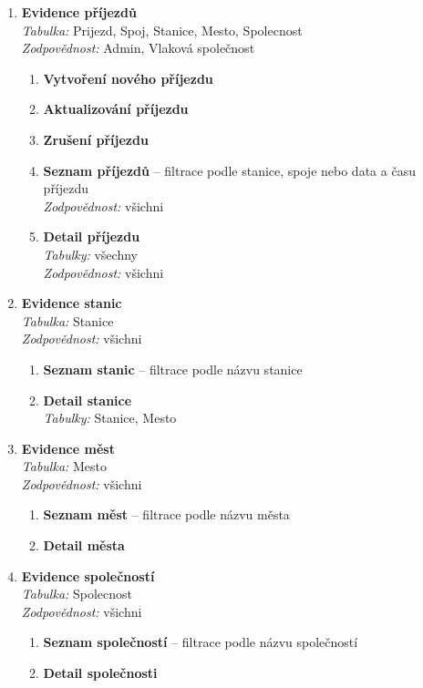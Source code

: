\documentclass[11pt]{article}
\begin{document}
\begin{enumerate}
    \item \textbf{Evidence příjezdů}\\
        \textit{Tabulka:} Prijezd, Spoj, Stanice, Mesto, Spolecnost\\
        \textit{Zodpovědnost:} Admin, Vlaková společnost
        \begin{enumerate}
            \item \textbf{Vytvoření nového příjezdu}
            \item \textbf{Aktualizování příjezdu}
            \item \textbf{Zrušení příjezdu}
            \item \textbf{Seznam příjezdů} – filtrace podle stanice, spoje nebo data a času příjezdu\\
            \textit{Zodpovědnost:} všichni
            \item \textbf{Detail příjezdu}\\
            \textit{Tabulky:} všechny\\
            \textit{Zodpovědnost:} všichni
        \end{enumerate}

    \item \textbf{Evidence stanic}\\
        \textit{Tabulka:} Stanice\\
        \textit{Zodpovědnost:} všichni
        \begin{enumerate}
            \item \textbf{Seznam stanic} – filtrace podle názvu stanice
            \item \textbf{Detail stanice}\\
            \textit{Tabulky:} Stanice, Mesto
        \end{enumerate}

    \item \textbf{Evidence měst}\\
        \textit{Tabulka:} Mesto\\
        \textit{Zodpovědnost:} všichni
        \begin{enumerate}
            \item \textbf{Seznam měst} – filtrace podle názvu města
            \item \textbf{Detail města}
        \end{enumerate}

    \item \textbf{Evidence společností}\\
        \textit{Tabulka:} Spolecnost\\
        \textit{Zodpovědnost:} všichni
        \begin{enumerate}
            \item \textbf{Seznam společností} – filtrace podle názvu společností
            \item \textbf{Detail společnosti}
        \end{enumerate}
\end{enumerate}
\end{document}
